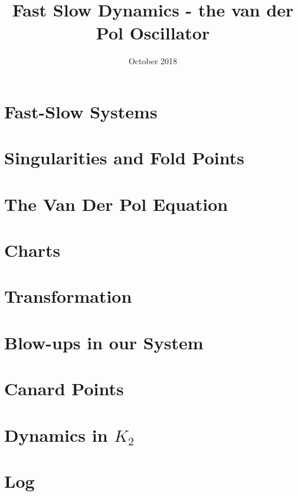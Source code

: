 \documentclass{article}
\title{Fast Slow Dynamics - the van der Pol Oscillator}
\author{}
\date{October 2018}
\theoremstyle{definition}
\begin{document}
\maketitle

\section{Fast-Slow Systems} \label{Intro}


\section{Singularities and Fold Points}


\section{The Van Der Pol Equation}


\section{Charts}\label{sec: charts}


\section{Transformation}


\section{Blow-ups in our System}\label{sec: VDP Blowup}


\section{Canard Points}

\newpage
\appendix
\section{Dynamics in \texorpdfstring{$K_2$}{K2}}

\newpage


\nocite{strogatz2007nonlinear}
\appendix
\section{Log}
\end{document}
